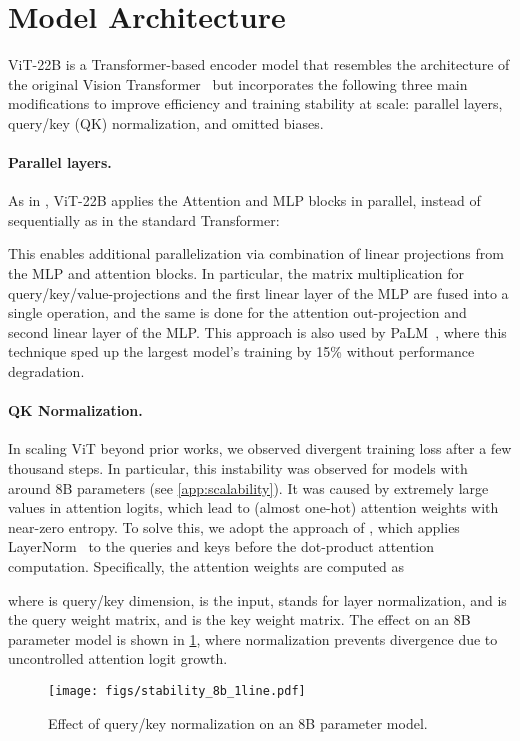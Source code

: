 \documentclass{article}
\newcommand{\chonk}{\mbox{ViT-22B}\xspace}
\begin{document}
 \section{Model Architecture}
\label{sec:model_architecture}

\chonk is a Transformer-based encoder model that resembles the architecture of the original Vision Transformer~\citep{dosovitskiy2020image} but incorporates the following three main modifications to improve efficiency and training stability at scale: parallel layers, query/key (QK) normalization, and omitted biases.


\paragraph{Parallel layers.}
As in \citet{gpt-j}, \chonk applies the Attention and MLP blocks in parallel, instead of sequentially as in the standard Transformer:
 
This enables additional parallelization via combination of linear projections from the MLP and attention blocks. In particular, the matrix multiplication for query/key/value-projections and the first linear layer of the MLP are fused into a single operation, and the same is done for the attention out-projection and second linear layer of the MLP. This approach is also used by PaLM~\citep{chowdhery2022palm}, where this technique sped up the largest model's training by 15\% without performance degradation. 
    
\paragraph{QK Normalization.}
In scaling ViT beyond prior works, we observed divergent training loss after a few thousand steps. In particular, this instability was observed for models with around 8B parameters (see \cref{app:scalability}). It was caused by extremely large values in attention logits, which lead to (almost one-hot) attention weights with near-zero entropy.
To solve this, we adopt the approach of \citet{gilmer2023intriguing}, which applies LayerNorm~\citep{ba2016layer} to the queries and keys before the dot-product attention computation.
Specifically, the attention weights are computed as

where  is query/key dimension,  is the input,  stands for layer normalization, and  is the query weight matrix, and  is the key weight matrix.
The effect on an 8B parameter model is shown in \cref{fig:stability_8b}, where normalization prevents divergence due to uncontrolled attention logit growth.
\begin{figure}[tbp]
    \centering
    \texttt{[image: figs/stability\_8b\_1line.pdf]}
\caption{Effect of query/key normalization on an 8B parameter model.}
\label{fig:stability_8b}
\end{figure}
\end{document}
